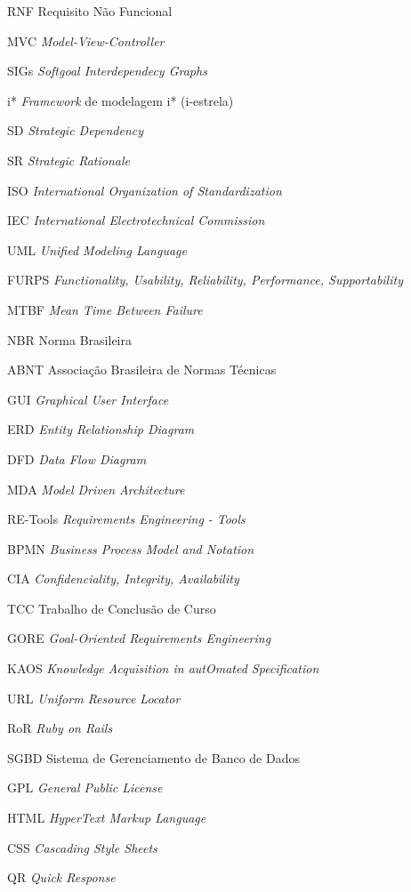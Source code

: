 \begin{siglas}
  \item[RNF] Requisito Não Funcional
  \item[MVC] \textit{Model-View-Controller}
  \item[SIGs] \textit{Softgoal Interdependecy Graphs}
  \item[i*] \textit{Framework} de modelagem i* (i-estrela)
  \item[SD] \textit{Strategic Dependency}
  \item[SR] \textit{Strategic Rationale}
  \item[ISO] \textit{International Organization of Standardization}
  \item[IEC] \textit{International Electrotechnical Commission}
  \item[UML] \textit{Unified Modeling Language}
  \item[FURPS] \textit{Functionality, Usability, Reliability, Performance, Supportability}
  \item[MTBF] \textit{Mean Time Between Failure}
  \item[NBR] Norma Brasileira
  \item[ABNT] Associação Brasileira de Normas Técnicas
  \item[GUI] \textit{Graphical User Interface}
  \item[ERD] \textit{Entity Relationship Diagram}
  \item[DFD] \textit{Data Flow Diagram}
  \item[MDA] \textit{Model Driven Architecture}
  \item[RE-Tools] \textit{Requirements Engineering - Tools}
  \item[BPMN] \textit{Business Process Model and Notation}
  \item[CIA] \textit{Confidenciality, Integrity, Availability}
  \item[TCC] Trabalho de Conclusão de Curso
  \item[GORE] \textit{Goal-Oriented Requirements Engineering}
  \item[KAOS] \textit{Knowledge Acquisition in autOmated Specification}
  \item[URL] \textit{Uniform Resource Locator}
  \item[RoR] \textit{Ruby on Rails}
  \item[SGBD] Sistema de Gerenciamento de Banco de Dados
  \item[GPL] \textit{General Public License}
  \item[HTML] \textit{HyperText Markup Language}
  \item[CSS] \textit{Cascading Style Sheets}
  \item[QR] \textit{Quick Response}
\end{siglas}
